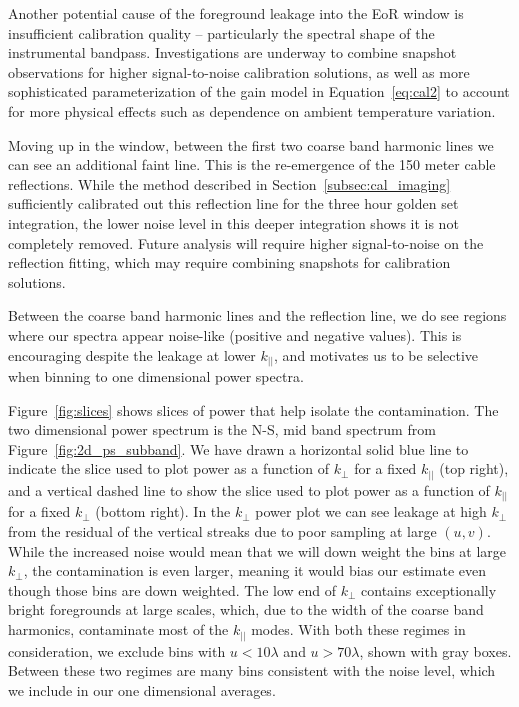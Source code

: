 \documentclass[iop]{emulateapj}
\begin{document}
Another potential cause of the foreground leakage into the EoR window is insufficient
calibration quality -- particularly the spectral shape of the instrumental bandpass.
Investigations are underway to combine snapshot observations for higher signal-to-noise
calibration solutions, as well as more sophisticated parameterization of the gain model in
Equation~\ref{eq:cal2} to account for more physical effects such as dependence on
ambient temperature variation.

Moving up in the window, between the first two coarse band harmonic lines we can see an 
additional faint line. This is the re-emergence of the 150 meter cable reflections. While the 
method described in Section~\ref{subsec:cal_imaging} sufficiently calibrated out this 
reflection line for the three hour golden set integration, the lower noise level in this deeper 
integration shows it is not completely removed. Future analysis will require higher 
signal-to-noise on the reflection fitting, which may require combining snapshots for calibration 
solutions. 

Between the coarse band harmonic lines and the reflection line, we do see regions where 
our spectra appear noise-like (positive and negative values). This is encouraging despite 
the leakage at lower $k_{||}$, and motivates us to be selective when binning to one 
dimensional power spectra.

Figure~\ref{fig:slices} shows slices of power that help isolate the contamination. The two 
dimensional power spectrum is the N-S, mid band spectrum from 
Figure~\ref{fig:2d_ps_subband}. We have drawn a horizontal solid blue line to indicate the 
slice used to plot power as a function of $k_{\perp}$ for a fixed $k_{||}$ (top right), and a 
vertical dashed line to show the slice used to plot power as a function of $k_{||}$ for a fixed 
$k_{\perp}$ (bottom right). 
In the $k_{\perp}$ power plot we can see leakage at high $k_{\perp}$ from the residual of the 
vertical streaks due to poor sampling at large $(u,v)$. While the increased noise would
mean that we will down weight the bins at large $k_{\perp}$, the contamination is even
larger, meaning it would bias our estimate even though those bins are down weighted.
The low end of $k_{\perp}$ contains exceptionally bright foregrounds at large scales, which,
due to the width of the coarse band harmonics, contaminate most of the $k_{||}$ modes. 
With both these regimes in consideration, 
we exclude bins with $u<10\lambda$ and $u>70\lambda$, shown with gray boxes.
Between these two regimes are many bins consistent with the noise level, which we include
in our one dimensional averages.
\end{document}
